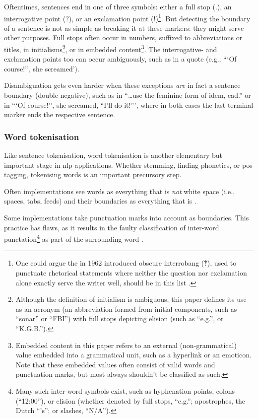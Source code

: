 Oftentimes, sentences end in one of three symbols: either a full stop (.),
  an interrogative point (?), or an exclamation point (!)\footnote{One
    could argue the in 1962 introduced
    obscure interrobang (‽), used to punctuate rhetorical statements where
    neither the question nor exclamation alone exactly serve the writer
    well, should be in this list \autocite{interrobang-mks.com}.}.
But detecting the boundary of a sentence is not as simple as breaking it at
  these markers: they might serve other purposes.
Full stops often occur in numbers, suffixed to abbreviations or titles,
  in initialisms\footnote{Although
    the definition of initialism is ambiguous, this paper defines its use
    as an acronym (an abbreviation formed from initial components, such as
    ``sonar'' or ``FBI'') with full stops depicting elision (such as
    ``e.g.'', or ``K.G.B.'').},
  or in embedded content\footnote{Embedded
    content in this paper refers to an external (non-grammatical) value
    embedded into a grammatical unit, such as a hyperlink or an emoticon.
    Note that these embedded values often consist of valid words and
    punctuation marks, but most always shouldn't be classified as such.}.
The interrogative- and exclamation points too can occur ambiguously, such as
  in a quote (e.g., ```Of course!'', she screamed').

Disambiguation gets even harder when these exceptions \emph{are} in fact a
  sentence boundary (double negative), such as in
  ``\ldots{}use the feminine form of idem, ead.'' or in
  ```Of course!'', she screamed, ``I'll do it!''', where in both
  cases the last terminal marker ends the respective sentence.

\subsubsection{Word tokenisation}\label{word-tokenisation}

Like sentence tokenisation, word tokenisation is another elementary but
important stage in \gls{nlp} applications. Whether stemming, finding
phonetics, or \gls{pos} tagging, tokenising words is an important
precursory step.

Often implementations see words as everything that is \emph{not} white
  space (i.e., spaces, tabs, feeds) and their boundaries as everything that
  is \autocite{loadfive/knwl-source-code}.

Some implementations take punctuation marks into account as boundaries.
This practice has flaws, as it results in the faulty classification of
  inter-word punctation\footnote{Many such inter-word symbols exist, such
    as hyphenation points, colons (``12:00''), or elision (whether denoted
    by full stops, ``e.g.''; apostrophes, the Dutch ``'s''; or slashes,
    ``N/A'').}
  as part of the surrounding word \autocite{NaturalNode/natural-source-code}.

